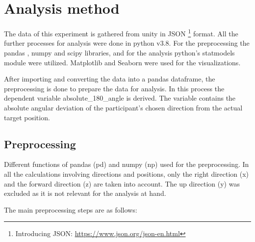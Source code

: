 \section{Analysis method}

The data of this experiment is gathered from unity in JSON \footnote{Introducing JSON: \href{https://www.json.org/json-en.html}{https://www.json.org/json-en.html}} format. All the further processes for analysis were done in python \autocite{10.5555/1593511} v3.8. For the preprocessing the pandas \autocite{reback2022pandas, mckinney-proc-scipy-2010}, numpy \autocite{harris2020array} and scipy \autocite{2020SciPy-NMeth} libraries, and for the analysis python's statmodels \autocite{seabold2010statsmodels} module were utilized. Matplotlib \autocite{Hunter:2007} and Seaborn \autocite{Waskom2021} were used for the visualizations.

After importing and converting the data into a pandas dataframe, the preprocessing is done to prepare the data for analysis. In this process the dependent variable {\emphasize absolute\_180\_angle} is derived. The variable contains the absolute angular deviation of the participant's chosen direction from the actual target position. 

\subsection{Preprocessing}

Different functions of pandas {\emphasize (pd)} and numpy {\emphasize (np)} used for the preprocessing. In all the calculations involving directions and positions, only the right direction (x) and the forward direction (z) are taken into account. The up direction (y) was excluded as it is not relevant for the analysis at hand. 

The main preprocessing steps are as follows:

